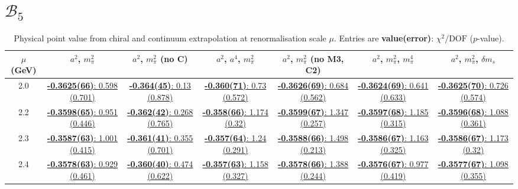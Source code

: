 \documentclass[12pt]{extarticle}
\begin{document}
\section{$\mathcal{B}_5$}
\begin{table}[h!]
\begin{center}
\begin{tabular}{|c|c|c|c|c|c|c|}
\hline
$\mu$ (GeV) & $a^2$, $m_\pi^2$& $a^2$, $m_\pi^2$ (no C)& $a^2$, $a^4$, $m_\pi^2$& $a^2$, $m_\pi^2$ (no M3, C2)& $a^2$, $m_\pi^2$, $m_\pi^4$& $a^2$, $m_\pi^2$, $\delta m_s$\\
\hline
2.0& \hyperlink{TT/NPR/a2m2_20.pdf.1}{\textbf{-0.3625(66)}: 0.598 (0.701)} & \hyperlink{TT/NPR/a2m2noC_20.pdf.1}{\textbf{-0.364(45)}: 0.13 (0.878)} & \hyperlink{TT/NPR/a2a4m2_20.pdf.1}{\textbf{-0.360(71)}: 0.73 (0.572)} & \hyperlink{TT/NPR/a2m2mcut_20.pdf.1}{\textbf{-0.3626(69)}: 0.684 (0.562)} & \hyperlink{TT/NPR/a2m2m4_20.pdf.1}{\textbf{-0.3624(69)}: 0.641 (0.633)} & \hyperlink{TT/NPR/a2m2delm_20.pdf.1}{\textbf{-0.3625(70)}: 0.726 (0.574)}\\
2.2& \hyperlink{TT/NPR/a2m2_22.pdf.1}{\textbf{-0.3598(65)}: 0.951 (0.446)} & \hyperlink{TT/NPR/a2m2noC_22.pdf.1}{\textbf{-0.362(42)}: 0.268 (0.765)} & \hyperlink{TT/NPR/a2a4m2_22.pdf.1}{\textbf{-0.358(66)}: 1.174 (0.32)} & \hyperlink{TT/NPR/a2m2mcut_22.pdf.1}{\textbf{-0.3599(67)}: 1.347 (0.257)} & \hyperlink{TT/NPR/a2m2m4_22.pdf.1}{\textbf{-0.3597(68)}: 1.185 (0.315)} & \hyperlink{TT/NPR/a2m2delm_22.pdf.1}{\textbf{-0.3596(68)}: 1.088 (0.361)}\\
2.3& \hyperlink{TT/NPR/a2m2_23.pdf.1}{\textbf{-0.3587(63)}: 1.001 (0.415)} & \hyperlink{TT/NPR/a2m2noC_23.pdf.1}{\textbf{-0.361(41)}: 0.355 (0.701)} & \hyperlink{TT/NPR/a2a4m2_23.pdf.1}{\textbf{-0.357(64)}: 1.24 (0.291)} & \hyperlink{TT/NPR/a2m2mcut_23.pdf.1}{\textbf{-0.3588(66)}: 1.498 (0.213)} & \hyperlink{TT/NPR/a2m2m4_23.pdf.1}{\textbf{-0.3586(67)}: 1.163 (0.325)} & \hyperlink{TT/NPR/a2m2delm_23.pdf.1}{\textbf{-0.3586(67)}: 1.173 (0.32)}\\
2.4& \hyperlink{TT/NPR/a2m2_24.pdf.1}{\textbf{-0.3578(63)}: 0.929 (0.461)} & \hyperlink{TT/NPR/a2m2noC_24.pdf.1}{\textbf{-0.360(40)}: 0.474 (0.622)} & \hyperlink{TT/NPR/a2a4m2_24.pdf.1}{\textbf{-0.357(63)}: 1.158 (0.327)} & \hyperlink{TT/NPR/a2m2mcut_24.pdf.1}{\textbf{-0.3578(66)}: 1.388 (0.244)} & \hyperlink{TT/NPR/a2m2m4_24.pdf.1}{\textbf{-0.3576(67)}: 0.977 (0.419)} & \hyperlink{TT/NPR/a2m2delm_24.pdf.1}{\textbf{-0.3577(67)}: 1.098 (0.355)}\\
\hline
\end{tabular}
\caption{Physical point value from chiral and continuum extrapolation at renormalisation scale $\mu$. Entries are \textbf{value(error)}: $\chi^2/\text{DOF}$ ($p$-value).}
\end{center}
\end{table}
\end{document}
